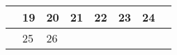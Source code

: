 {\begin{tabularx}{\linewidth}{|l!{\vrule width \myLenLineThicknessThick}*{7}{@{}X@{}|}}
       & 
    
      
      
        \begin{minipage}[t]{6mm}\centering{}19\end{minipage}
      
       & 
    
      
      
        \begin{minipage}[t]{6mm}\centering{}20\end{minipage}
      
       & 
    
      
      
        \begin{minipage}[t]{6mm}\centering{}21\end{minipage}
      
       & 
    
      
      
        \begin{minipage}[t]{6mm}\centering{}22\end{minipage}
      
       & 
    
      
      
        \begin{minipage}[t]{6mm}\centering{}23\end{minipage}
      
       & 
    
      
      
        \begin{minipage}[t]{6mm}\centering{}24\end{minipage}
      
      
        \\  \hline 
      
    
  
  
  
  \hyperlink{week-2027-43}{} &
    
      
      
        \begin{minipage}[t]{6mm}\centering{}25\end{minipage}
      
       & 
    
      
      
        \begin{minipage}[t]{6mm}\centering{}26\end{minipage}
      

\end{tabularx}}
